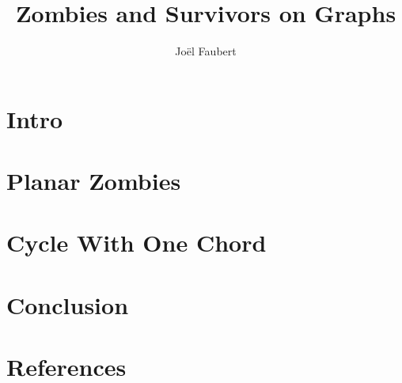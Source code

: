 \documentclass{beamer} %
\author{Jo\"el Faubert}
\title{Zombies and Survivors on Graphs}
\begin{document}
\begin{comment}
:Title: Thesis defense: Zombies and Survivors on Graphs
:Tags: Thesis; vertex pursuit games;
\end{comment}

\everymath{\displaystyle}

\section{Intro}


\section{Planar Zombies}


\section{Cycle With One Chord}


\section{Conclusion}


\section{References}

\end{document}

